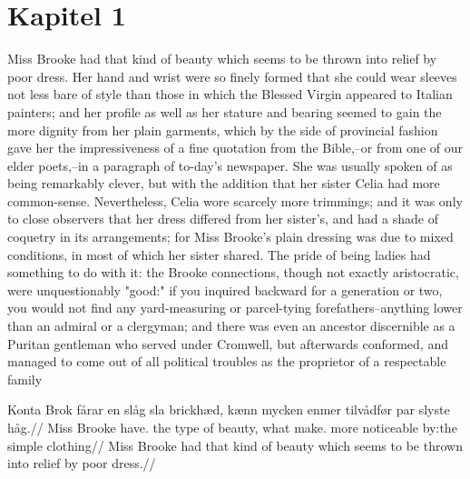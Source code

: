 \chapter{Kapitel 1}

Miss Brooke had that kind of beauty which seems to be thrown into relief by poor dress. Her hand and wrist were so finely formed that she could wear sleeves not less bare of style than those in which the Blessed Virgin appeared to Italian painters; and her profile as well as her stature and bearing seemed to gain the more dignity from her plain garments, which by the side of provincial fashion gave her the impressiveness of a fine quotation from the Bible,--or from one of our elder poets,--in a paragraph of to-day's newspaper. She was usually spoken of as being remarkably clever, but with the addition that her sister Celia had more common-sense. Nevertheless, Celia wore scarcely more trimmings; and it was only to close observers that her dress differed from her sister's, and had a shade of coquetry in its arrangements; for Miss Brooke's plain dressing was due to mixed conditions, in most of which her sister shared. The pride of being ladies had something to do with it: the Brooke connections, though not exactly aristocratic, were unquestionably "good:" if you inquired backward for a generation or two, you would not find any yard-measuring or parcel-tying forefathers--anything lower than an admiral or a clergyman; and there was even an ancestor discernible as a Puritan gentleman who served under Cromwell, but afterwards conformed, and managed to come out of all political troubles as the proprietor of a respectable family

\pex
\begingl
\gla Konta Brok fårar en slåg sla brickhæd, kænn mycken enmer tilvådfør par slyste håg.//
\glb Miss Brooke have.\Pst{} the type of beauty, what make.\Pass{} more noticeable by:the simple clothing//
\glft Miss Brooke had that kind of beauty which seems to be thrown into relief by poor dress.//
\endgl
\xe
\pex
\begingl
